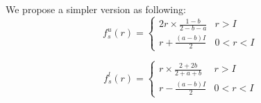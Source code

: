 \documentclass[notitlepage,reqno,11pt]{amsart}
\numberwithin{equation}{section}
\begin{document}
We propose a simpler version as following:
\begin{equation*}
f_s^u(r) =
\begin{cases}
  2r\times\frac{1-b}{2-b-a} & r > I \\
  r + \frac{(a-b)I}{2} & 0 < r <I
\end{cases}
\end{equation*}

\begin{equation*}
f_s^l(r) =
\begin{cases}
  r\times\frac{2+2b}{2+a+b} & r > I \\
  r - \frac{(a-b)I}{2} & 0 < r <I
\end{cases}
\end{equation*}
    
\end{document}
